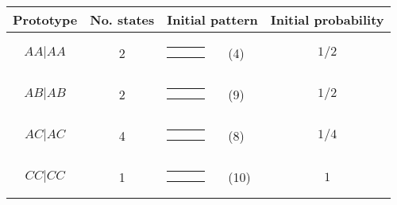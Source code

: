 \begin{center}
\begin{tabular}{ccrlc} \hline
Prototype & No. states & \multicolumn{2}{c}{Initial pattern} & Initial probability \\ \hline
$AA|AA$ & 2 & 
{\renewcommand{\arraystretch}{0.3}
\renewcommand{\tabcolsep}{0.5mm}
\parbox[b][3mm][c]{12mm}{
\begin{tabular}{|p{2mm}|p{2mm}||p{2mm}|} \hline
$\bullet$ &           &           \\
$\bullet$ &           &           \\ \hline
\end{tabular}}}
& (4) & $1/2$ \\
$AB|AB$ & 2 & 
{\renewcommand{\arraystretch}{0.3}
\renewcommand{\tabcolsep}{0.5mm}
\parbox[b][3mm][c]{12mm}{
\begin{tabular}{|p{2mm}|p{2mm}||p{2mm}|} \hline
$\bullet$ &           &           \\
          & $\bullet$ &           \\ \hline
\end{tabular}}}
& (9) & $1/2$ \\
$AC|AC$ & 4 & 
{\renewcommand{\arraystretch}{0.3}
\renewcommand{\tabcolsep}{0.5mm}
\parbox[b][3mm][c]{12mm}{
\begin{tabular}{|p{2mm}|p{2mm}||p{2mm}|} \hline
$\bullet$ &           &           \\
          &           & $\bullet$ \\ \hline
\end{tabular}}}
& (8) & $1/4$ \\
$CC|CC$ & 1 & 
{\renewcommand{\arraystretch}{0.3}
\renewcommand{\tabcolsep}{0.5mm}
\parbox[b][3mm][c]{12mm}{
\begin{tabular}{|p{2mm}|p{2mm}||p{2mm}|} \hline
          &           & $\bullet$ \\
          &           & $\bullet$ \\ \hline
\end{tabular}}}
& (10) & $1$ \\
\hline
\end{tabular}
\end{center}
